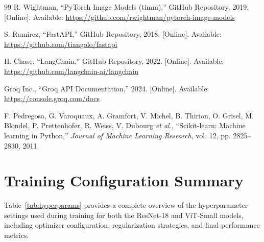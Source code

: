 \documentclass[12pt]{report}
\begin{document}
\begin{thebibliography}{99}
R. Wightman,
``PyTorch Image Models (timm),''
GitHub Repository, 2019. [Online]. Available:
\url{https://github.com/rwightman/pytorch-image-models}

S. Ramirez,
``FastAPI,''
GitHub Repository, 2018. [Online]. Available:
\url{https://github.com/tiangolo/fastapi}

H. Chase,
``LangChain,''
GitHub Repository, 2022. [Online]. Available:
\url{https://github.com/langchain-ai/langchain}

Groq Inc.,
``Groq API Documentation,''
2024. [Online]. Available:
\url{https://console.groq.com/docs}

F. Pedregosa, G. Varoquaux, A. Gramfort, V. Michel, B. Thirion,
O. Grisel, M. Blondel, P. Prettenhofer, R. Weiss, V. Dubourg
\textit{et al.},
``Scikit-learn: Machine learning in Python,''
\textit{Journal of Machine Learning Research}, vol. 12,
pp. 2825--2830, 2011.

\end{thebibliography}


\appendix


\chapter{Training Configuration Summary}

Table~\ref{tab:hyperparams} provides a complete overview of the hyperparameter settings used during training for both the ResNet-18 and ViT-Small models, including optimizer configuration, regularization strategies, and final performance metrics.
\end{document}
